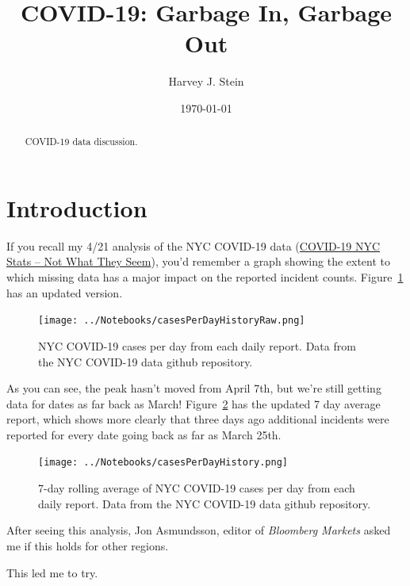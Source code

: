 \documentclass[10pt,reqno]{amsart}
\author{Harvey J. Stein}
\date{\today}
\begin{document}
\title{COVID-19: Garbage In, Garbage Out}

\begin{abstract}
  COVID-19 data discussion.
\end{abstract}

\maketitle
\tableofcontents

\section{Introduction}
\label{sec:intro}
If you recall my 4/21 analysis of the NYC COVID-19 data
(\href{https://hjstein.blogspot.com/2020/04/covid-19-nyc-stats-not-what-they-seem.html}{COVID-19 NYC Stats -- Not What They Seem}),
you'd remember a graph showing the extent to which missing
data has a major impact on the reported incident counts.
Figure~\ref{fig:daily} has an updated version.

\begin{figure}[H]
  \centering
  \texttt{[image: ../Notebooks/casesPerDayHistoryRaw.png]}
  \caption{NYC COVID-19 cases per day from each daily report.  Data
    from the NYC COVID-19 data github repository.}
  \label{fig:daily}
\end{figure}

As you can see, the peak hasn't moved from April 7th, but we're still
getting data for dates as far back as March!
Figure~\ref{fig:smoothDaily} has the updated 7 day average report,
which shows more clearly that three days ago additional incidents were
reported for every date going back as far as March 25th.

\begin{figure}[H]
  \centering
  \texttt{[image: ../Notebooks/casesPerDayHistory.png]}
  \caption{7-day rolling average of NYC COVID-19 cases per day from each daily report.  Data
    from the NYC COVID-19 data github repository.}
  \label{fig:smoothDaily}
\end{figure}

After seeing this analysis, Jon Asmundsson, editor of {\it Bloomberg
  Markets} asked me if this holds for other regions.\cite{Asmundsson2020Dates}

This led me to try.
\end{document}
